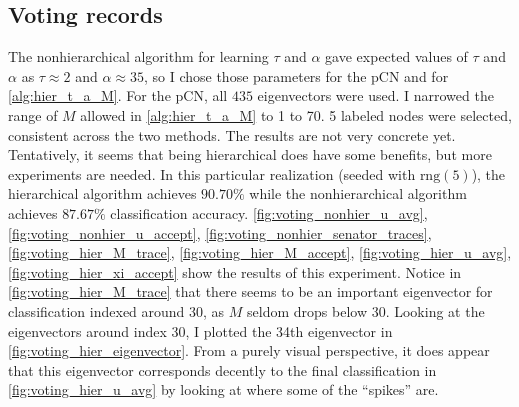 \documentclass{siamart1116}
\begin{document}
\subsection{Voting records}
The nonhierarchical algorithm for learning $\tau$ and $\alpha$ gave expected values of $\tau$ and $\alpha$ as $\tau \approx 2$ and $\alpha \approx 35$, so I chose those parameters for the pCN and for \cref{alg:hier_t_a_M}. For the pCN, all $435$ eigenvectors were used. I narrowed the range of $M$ allowed in \cref{alg:hier_t_a_M} to 1 to 70. 5 labeled nodes were selected, consistent across the two methods. The results are not very concrete yet. Tentatively, it seems that being hierarchical does have some benefits, but more experiments are needed. In this particular realization (seeded with $\text{rng}(5)$), the hierarchical algorithm achieves $90.70\%$ while the nonhierarchical algorithm achieves $87.67\%$ classification accuracy. \cref{fig:voting_nonhier_u_avg}, \cref{fig:voting_nonhier_u_accept}, \cref{fig:voting_nonhier_senator_traces}, \cref{fig:voting_hier_M_trace}, \cref{fig:voting_hier_M_accept}, \cref{fig:voting_hier_u_avg}, \cref{fig:voting_hier_xi_accept} show the results of this experiment. Notice in \cref{fig:voting_hier_M_trace} that there seems to be an important eigenvector for classification indexed around 30, as $M$ seldom drops below $30$. Looking at the eigenvectors around index 30, I plotted the 34th eigenvector in \cref{fig:voting_hier_eigenvector}. From a purely visual perspective, it does appear that this eigenvector corresponds decently to the final classification in \cref{fig:voting_hier_u_avg} by looking at where some of the ``spikes'' are.
\end{document}
